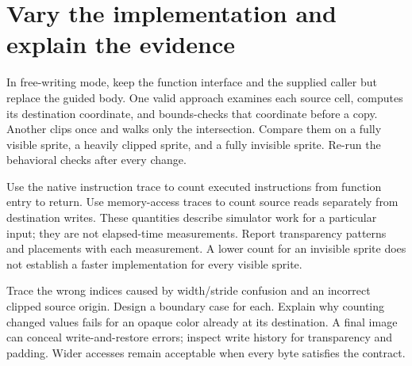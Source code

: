 \section{Vary the implementation and explain the evidence}\label{blit-practice}
In free-writing mode, keep the function interface and the supplied caller but replace the guided body. One valid approach examines each source cell, computes its destination coordinate, and bounds-checks that coordinate before a copy. Another clips once and walks only the intersection. Compare them on a fully visible sprite, a heavily clipped sprite, and a fully invisible sprite. Re-run the behavioral checks after every change.

Use the native instruction trace to count executed instructions from function entry to return. Use memory-access traces to count source reads separately from destination writes. These quantities describe simulator work for a particular input; they are not elapsed-time measurements. Report transparency patterns and placements with each measurement. A lower count for an invisible sprite does not establish a faster implementation for every visible sprite.

Trace the wrong indices caused by width/stride confusion and an incorrect clipped source origin. Design a boundary case for each. Explain why counting changed values fails for an opaque color already at its destination. A final image can conceal write-and-restore errors; inspect write history for transparency and padding. Wider accesses remain acceptable when every byte satisfies the contract.
